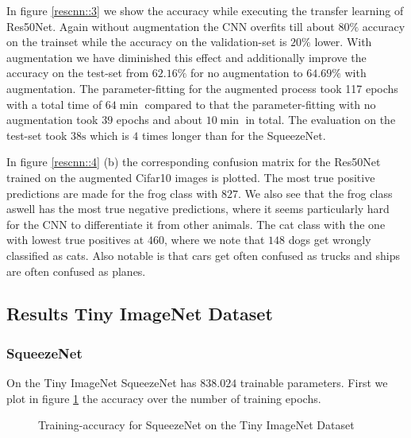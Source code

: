 \documentclass[11pt]{article}
\begin{document}
In figure \ref{rescnn::3} we show the accuracy while executing the transfer learning of Res50Net. Again without augmentation the CNN overfits till about $80\%$ accuracy on the trainset while the accuracy on the validation-set is $20\%$ lower. With augmentation we have diminished this effect and additionally improve the accuracy on the test-set from $62.16\%$ for no augmentation to $64.69\%$ with augmentation. The parameter-fitting for the augmented process took 117 epochs with a total time of $64 \min$ compared to that the parameter-fitting with no augmentation took $39$ epochs and about $10 \min$ in total. The evaluation on the test-set took $38\text{s}$ which is  $4$ times longer than for the SqueezeNet.

In figure \ref{rescnn::4} (b) the corresponding confusion matrix for the Res50Net trained on the augmented Cifar10 images is plotted. The most true positive predictions are made for the frog class with $827$. We also see that the frog class aswell has the most true negative predictions, where it seems particularly hard for the CNN to differentiate it from other animals. The cat class with the one with lowest true positives at $460$, where we note that $148$ dogs get wrongly classified as cats. Also notable is that cars get often confused as trucks and ships are often confused as planes.

\subsection{Results Tiny ImageNet Dataset}
\subsubsection{SqueezeNet}
On the Tiny ImageNet SqueezeNet has $838.024$ trainable parameters. First we plot in figure \ref{rescnn::5} the accuracy over the number of training epochs.

\begin{figure}
\centering
{}
  \hfill
  \hfill
\caption{Training-accuracy for SqueezeNet on the Tiny ImageNet Dataset}
\label{rescnn::5}
\end{figure}
\end{document}
